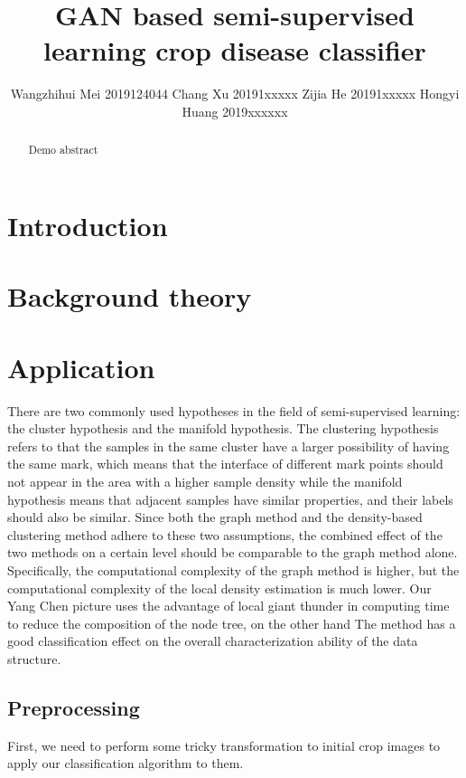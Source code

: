 \documentclass[11pt,en]{elegantpaper}
\title{GAN based semi-supervised learning crop disease classifier}
\author{Wangzhihui Mei 2019124044 Chang Xu 20191xxxxx Zijia He 20191xxxxx Hongyi Huang 2019xxxxxx}
\institute{CCNU-UOW JI}
\date{}
\begin{document}
\maketitle

\begin{abstract}
	Demo abstract
\end{abstract}

\section{Introduction}

\section{Background theory}

\section{Application}
There are two commonly used hypotheses in the field of semi-supervised learning: the cluster hypothesis and the manifold hypothesis. The clustering hypothesis refers to that the samples in the same cluster have a larger possibility of having the same mark, which means that the interface of different mark points should not appear in the area with a higher sample density while the manifold hypothesis means that adjacent samples have similar properties, and their labels should also be similar\cite{shen2003multilabel}. Since both the graph method and the density-based clustering method adhere to these two assumptions, the combined effect of the two methods on a certain level should be comparable to the graph method alone. Specifically, the computational complexity of the graph method is higher, but the computational complexity of the local density estimation is much lower. Our Yang Chen picture uses the advantage of local giant thunder in computing time to reduce the composition of the node tree, on the other hand The method has a good classification effect on the overall characterization ability of the data structure.
\subsection{}


\subsection{Preprocessing}
First, we need to perform some tricky transformation to initial crop images to apply our classification algorithm to them. 
\end{document}
